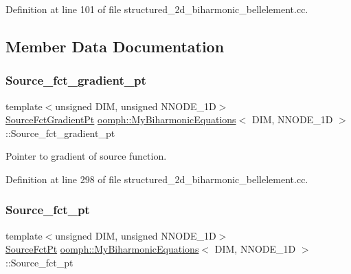 Definition at line 101 of file structured\+\_\+2d\+\_\+biharmonic\+\_\+bellelement.\+cc.



\subsection{Member Data Documentation}
\mbox{\label{classoomph_1_1MyBiharmonicEquations_afbd71d4a6c31f36d88bf60697c4140aa}} 
\subsubsection{\texorpdfstring{Source\+\_\+fct\+\_\+gradient\+\_\+pt}{Source\_fct\_gradient\_pt}}
{\footnotesize\ttfamily template$<$unsigned D\+IM, unsigned N\+N\+O\+D\+E\+\_\+1D$>$ \\
\hyperlink{classoomph_1_1MyBiharmonicEquations_af007c03701e888fed7375cb4537f0046}{Source\+Fct\+Gradient\+Pt} \hyperlink{classoomph_1_1MyBiharmonicEquations}{oomph\+::\+My\+Biharmonic\+Equations}$<$ D\+IM, N\+N\+O\+D\+E\+\_\+1D $>$\+::Source\+\_\+fct\+\_\+gradient\+\_\+pt\hspace{0.3cm}{\ttfamily [protected]}}



Pointer to gradient of source function. 



Definition at line 298 of file structured\+\_\+2d\+\_\+biharmonic\+\_\+bellelement.\+cc.

\mbox{\label{classoomph_1_1MyBiharmonicEquations_aa96fd779e04f5c726f2535f43210e905}} 
\subsubsection{\texorpdfstring{Source\+\_\+fct\+\_\+pt}{Source\_fct\_pt}}
{\footnotesize\ttfamily template$<$unsigned D\+IM, unsigned N\+N\+O\+D\+E\+\_\+1D$>$ \\
\hyperlink{classoomph_1_1MyBiharmonicEquations_a17bd58054c66229016eb1c52eab36bc1}{Source\+Fct\+Pt} \hyperlink{classoomph_1_1MyBiharmonicEquations}{oomph\+::\+My\+Biharmonic\+Equations}$<$ D\+IM, N\+N\+O\+D\+E\+\_\+1D $>$\+::Source\+\_\+fct\+\_\+pt\hspace{0.3cm}{\ttfamily [protected]}}



